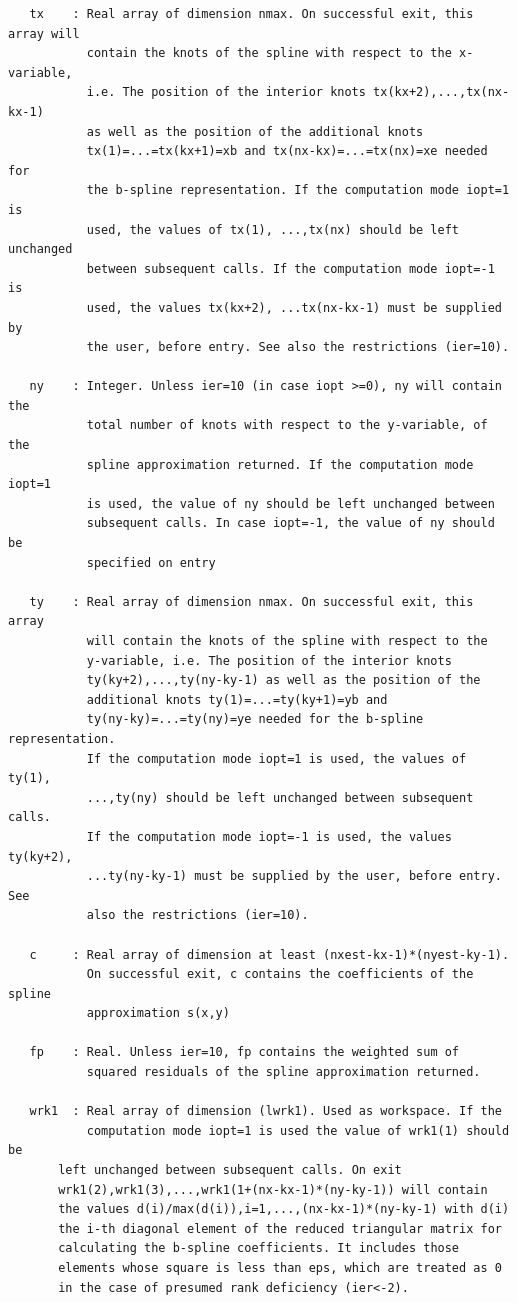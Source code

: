 \documentclass[11pt,twoside]{article}
\begin{document}
\begin{verbatim}
   tx    : Real array of dimension nmax. On successful exit, this array will
           contain the knots of the spline with respect to the x-variable,
           i.e. The position of the interior knots tx(kx+2),...,tx(nx-kx-1)
           as well as the position of the additional knots
           tx(1)=...=tx(kx+1)=xb and tx(nx-kx)=...=tx(nx)=xe needed for
           the b-spline representation. If the computation mode iopt=1 is
           used, the values of tx(1), ...,tx(nx) should be left unchanged
           between subsequent calls. If the computation mode iopt=-1 is
           used, the values tx(kx+2), ...tx(nx-kx-1) must be supplied by
           the user, before entry. See also the restrictions (ier=10).

   ny    : Integer. Unless ier=10 (in case iopt >=0), ny will contain the
           total number of knots with respect to the y-variable, of the
           spline approximation returned. If the computation mode iopt=1
           is used, the value of ny should be left unchanged between
           subsequent calls. In case iopt=-1, the value of ny should be
           specified on entry

   ty    : Real array of dimension nmax. On successful exit, this array
           will contain the knots of the spline with respect to the
           y-variable, i.e. The position of the interior knots
           ty(ky+2),...,ty(ny-ky-1) as well as the position of the
           additional knots ty(1)=...=ty(ky+1)=yb and
           ty(ny-ky)=...=ty(ny)=ye needed for the b-spline representation.
           If the computation mode iopt=1 is used, the values of ty(1),
           ...,ty(ny) should be left unchanged between subsequent calls.
           If the computation mode iopt=-1 is used, the values ty(ky+2),
           ...ty(ny-ky-1) must be supplied by the user, before entry. See
           also the restrictions (ier=10).

   c     : Real array of dimension at least (nxest-kx-1)*(nyest-ky-1).
           On successful exit, c contains the coefficients of the spline
           approximation s(x,y)

   fp    : Real. Unless ier=10, fp contains the weighted sum of
           squared residuals of the spline approximation returned.

   wrk1  : Real array of dimension (lwrk1). Used as workspace. If the
           computation mode iopt=1 is used the value of wrk1(1) should be
 	   left unchanged between subsequent calls. On exit
 	   wrk1(2),wrk1(3),...,wrk1(1+(nx-kx-1)*(ny-ky-1)) will contain
 	   the values d(i)/max(d(i)),i=1,...,(nx-kx-1)*(ny-ky-1) with d(i)
 	   the i-th diagonal element of the reduced triangular matrix for
 	   calculating the b-spline coefficients. It includes those
 	   elements whose square is less than eps, which are treated as 0
 	   in the case of presumed rank deficiency (ier<-2).


\end{verbatim}
\end{document}
